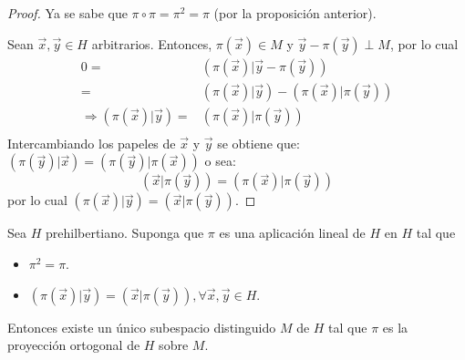 \documentclass[12pt]{report}
\newcounter{it}
\theoremstyle{largebreak}
\newcommand\pint[2]{\ensuremath{\left(#1\big| #2\right)}}
\begin{document}
\begin{proof}
        Ya se sabe que $\pi\circ\pi=\pi^2=\pi$ (por la proposición anterior).

        Sean $\vec{x},\vec{y}\in H$ arbitrarios. Entonces, $\pi(\vec{x})\in M$ y $\vec{y}-\pi(\vec{y})\perp M$, por lo cual
        \begin{equation*}
            \begin{split}
                0=&\pint{\pi(\vec{x})}{\vec{y}-\pi(\vec{y})} \\
                =&\pint{\pi(\vec{x})}{\vec{y}}-\pint{\pi(\vec{x})}{\pi(\vec{y})}\\
                \Rightarrow \pint{\pi(\vec{x})}{\vec{y}} =& \pint{\pi(\vec{x})}{\pi(\vec{y})}\\
            \end{split}
        \end{equation*}
        Intercambiando los papeles de $\vec{x}$ y $\vec{y}$ se obtiene que: $\pint{\pi(\vec{y})}{\vec{x}}=\pint{\pi(\vec{y})}{\pi(\vec{x})}$ o sea:
        \begin{equation*}
            \pint{\vec{x}}{\pi(\vec{y})}=\pint{\pi(\vec{x})}{\pi(\vec{y})}
        \end{equation*}
        por lo cual $\pint{\pi(\vec{x})}{\vec{y}}=\pint{\vec{x}}{\pi(\vec{y})}$.
    \end{proof}

    \begin{propo}
        Sea $H$ prehilbertiano. Suponga que $\pi$ es una aplicación lineal de $H$ en $H$ tal que
        \begin{itemize}
            \item $\pi^2=\pi$.
            \item $\pint{\pi(\vec{x})}{\vec{y}}=\pint{\vec{x}}{\pi(\vec{y})},\forall\vec{x},\vec{y}\in H$.
        \end{itemize}
        Entonces existe un único subespacio distinguido $M$ de $H$ tal que $\pi$ es la proyección ortogonal de $H$ sobre $M$.
    \end{propo}
\end{document}
